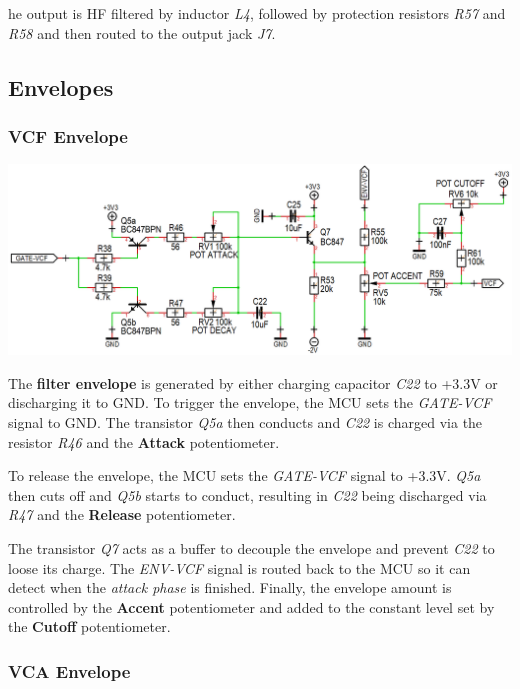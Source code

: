\documentclass{scrartcl}
\begin{document}
he output is HF filtered by inductor \emph{L4}, followed by protection resistors \emph{R57} and \emph{R58} and then routed to the output jack \emph{J7}.

\subsection{Envelopes}

\subsubsection{VCF Envelope}

\begin{center}
    \includegraphics[scale=0.35]{assets/schema-ar-vcf.png}
\end{center}

The \textbf{filter envelope} is generated by either charging capacitor \emph{C22} to +3.3V or discharging it to GND.
To trigger the envelope, the MCU sets the \emph{GATE-VCF} signal to GND. The transistor \emph{Q5a} then conducts and \emph{C22} is charged via the resistor \emph{R46} and the \textbf{Attack} potentiometer.

To release the envelope, the MCU sets the \emph{GATE-VCF} signal to +3.3V. \emph{Q5a} then cuts off and \emph{Q5b} starts to conduct, resulting in \emph{C22} being discharged via \emph{R47} and the \textbf{Release} potentiometer.

The transistor \emph{Q7} acts as a buffer to decouple the envelope and prevent \emph{C22} to loose its charge. The \emph{ENV-VCF} signal is routed back to the MCU so it can detect when the \emph{attack phase} is finished. Finally, the envelope amount is controlled by the \textbf{Accent} potentiometer and added to the constant level set by the \textbf{Cutoff} potentiometer.

\subsubsection{VCA Envelope}
\end{document}
